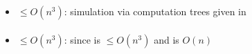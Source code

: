 \paragraph{\OMODLA{}\tto\TDFA}\label{cost:OM1DLAto2DFA}
\begin{itemize}
	\item $\le O(n^3)$: simulation via computation trees given in \cite{PigPri23a}
\end{itemize}
\paragraph{\OMODLA{}\tto\TNFA}
\begin{itemize}
	\item $\le O(n^3)$: since \hyperref[cost:OM1DLAto2DFA]{\OMODLA{}\tto\TDFA} is $\le O(n^3)$ and \TDFA{}\tto\TNFA is $O(n)$
\end{itemize}
